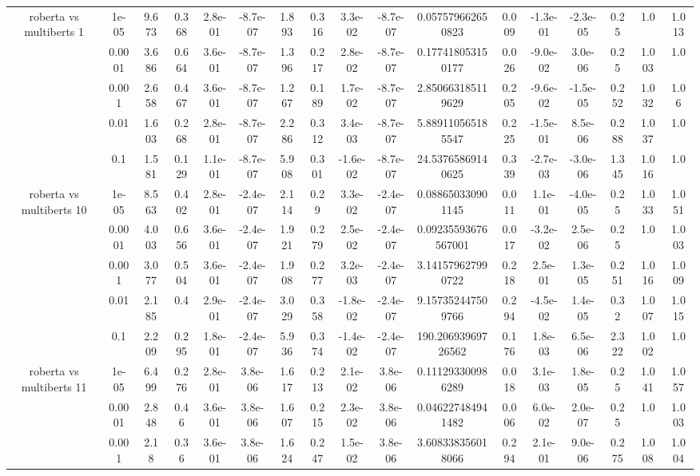\begin{tabular}{|c|c|c|c|c|c|c|c|c|c|c|c|c|c|c|c|c|}
\hline
\multirow{5}{*}{roberta  vs multiberts 1} & 1e-05 & 9.673 & 0.368 & 2.8e-01 & -8.7e-07 & 1.893 & 0.316 & 3.3e-02 & -8.7e-07 & 0.057579662650823 & 0.009 & -1.3e-01 & -2.3e-05 & 0.25 & 1.0 & 1.013 \\
 & 0.0001 & 3.686 & 0.664 & 3.6e-01 & -8.7e-07 & 1.396 & 0.217 & 2.8e-02 & -8.7e-07 & 0.177418053150177 & 0.026 & -9.0e-02 & 3.0e-06 & 0.25 & 1.003 & 1.0 \\
 & 0.001 & 2.658 & 0.467 & 3.6e-01 & -8.7e-07 & 1.267 & 0.189 & 1.7e-02 & -8.7e-07 & 2.850663185119629 & 0.205 & -9.6e-02 & -1.5e-05 & 0.252 & 1.032 & 1.06 \\
 & 0.01 & 1.603 & 0.268 & 2.8e-01 & -8.7e-07 & 2.286 & 0.312 & 3.4e-03 & -8.7e-07 & 5.889110565185547 & 0.225 & -1.5e-01 & 8.5e-06 & 0.288 & 1.037 & 1.0 \\
 & 0.1 & 1.581 & 0.129 & 1.1e-01 & -8.7e-07 & 5.908 & 0.301 & -1.6e-02 & -8.7e-07 & 24.53765869140625 & 0.339 & -2.7e-03 & -3.0e-06 & 1.345 & 1.016 & 1.0 \\
\hline
\multirow{5}{*}{roberta  vs multiberts 10} & 1e-05 & 8.563 & 0.402 & 2.8e-01 & -2.4e-07 & 2.114 & 0.29 & 3.3e-02 & -2.4e-07 & 0.088650330901145 & 0.011 & 1.1e-01 & -4.0e-05 & 0.25 & 1.033 & 1.051 \\
 & 0.0001 & 4.003 & 0.656 & 3.6e-01 & -2.4e-07 & 1.921 & 0.279 & 2.5e-02 & -2.4e-07 & 0.09235593676567001 & 0.017 & -3.2e-02 & 2.5e-06 & 0.25 & 1.0 & 1.003 \\
 & 0.001 & 3.077 & 0.504 & 3.6e-01 & -2.4e-07 & 1.908 & 0.277 & 3.2e-03 & -2.4e-07 & 3.141579627990722 & 0.218 & 2.5e-01 & 1.3e-05 & 0.251 & 1.016 & 1.009 \\
 & 0.01 & 2.185 & 0.4 & 2.9e-01 & -2.4e-07 & 3.029 & 0.358 & -1.8e-02 & -2.4e-07 & 9.157352447509766 & 0.294 & -4.5e-02 & 1.4e-05 & 0.32 & 1.007 & 1.015 \\
 & 0.1 & 2.209 & 0.295 & 1.8e-01 & -2.4e-07 & 5.936 & 0.374 & -1.4e-02 & -2.4e-07 & 190.20693969726562 & 0.176 & 1.8e-03 & 6.5e-06 & 2.322 & 1.002 & 1.0 \\
\hline
\multirow{5}{*}{roberta  vs multiberts 11} & 1e-05 & 6.499 & 0.276 & 2.8e-01 & 3.8e-06 & 1.617 & 0.213 & 2.1e-02 & 3.8e-06 & 0.111293300986289 & 0.018 & 3.1e-03 & 1.8e-05 & 0.25 & 1.041 & 1.057 \\
 & 0.0001 & 2.848 & 0.46 & 3.6e-01 & 3.8e-06 & 1.607 & 0.215 & 2.3e-02 & 3.8e-06 & 0.046227484941482 & 0.006 & 6.0e-02 & 2.0e-07 & 0.25 & 1.0 & 1.003 \\
 & 0.001 & 2.18 & 0.36 & 3.6e-01 & 3.8e-06 & 1.624 & 0.247 & 1.5e-02 & 3.8e-06 & 3.608338356018066 & 0.294 & 2.1e-01 & 9.0e-06 & 0.275 & 1.008 & 1.004 \\

\end{tabular}
